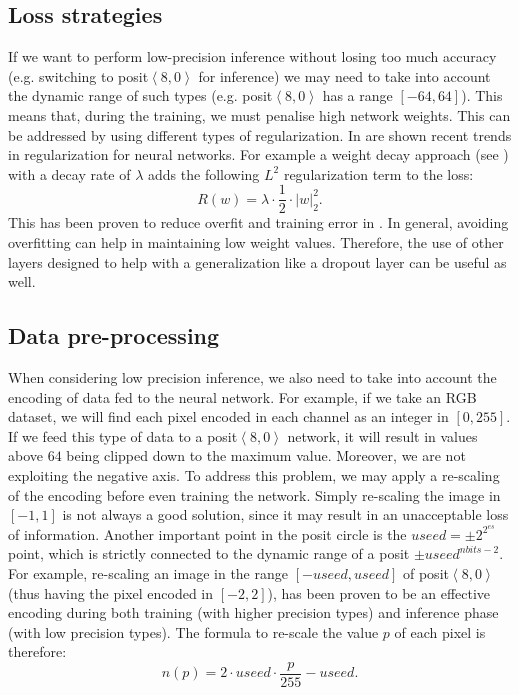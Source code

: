 \subsection{Loss strategies} If we want to perform low-precision inference without losing too much accuracy (e.g. switching to posit$\left <8,0\right>$ for inference) we may need to take into account the dynamic range of such types (e.g. posit$\left <8,0\right>$ has a range $[-64,64]$). This means that, during the training, we must penalise high network weights. This can be addressed by using different types of regularization. In \cite{kukaka2017regularization}  are shown recent trends in regularization for neural networks. For example a weight decay approach (see \cite{plaut1986experiments}) with a decay rate of $\lambda$ adds the following $L^2$ regularization term to the loss: \[R(w) = \lambda \cdot \frac{1}{2} \cdot \left | w \right |^2_2 . \] This has been proven to reduce overfit and training error in \cite{Krizhevsky:2017:ICD:3098997.3065386}. In general, avoiding overfitting can help in maintaining low weight values. Therefore, the use of other layers designed to help with a generalization like a dropout layer \cite{JMLR:v15:srivastava14a} can be useful as well.


\subsection{Data pre-processing} When considering low precision inference, we also need to take into account the encoding of data fed to the neural network. For example, if we take an RGB dataset, we will find each pixel encoded in each channel as an integer in $[0,255]$. If we feed this type of data to a posit$\left <8,0\right>$ network, it will result in values above $64$ being clipped down to the maximum value. Moreover, we are not exploiting the negative axis. To address this problem, we may apply a re-scaling of the encoding before even training the network. Simply re-scaling the image in $[-1,1]$ is not always a good solution, since it may result in an unacceptable loss of information. Another important point in the posit circle is the $useed = \pm 2^{2^{es}}$ point, which is strictly connected to the dynamic range of a posit $\pm useed^{nbits-2}$. For example, re-scaling an image in the range $[-useed,useed]$ of posit$\left <8,0\right>$ (thus having the pixel encoded in $[-2,2]$), has been proven to be an effective encoding during both training (with higher precision types) and inference phase (with low precision types). The formula to re-scale the value $p$ of each pixel is therefore: \[ n(p) = 2\cdot useed \cdot \frac{p}{255} - useed. \]

